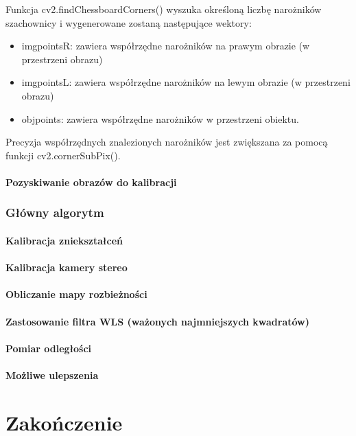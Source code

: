 \documentclass[magisterska]{pracadypl}
\begin{document}
Funkcja cv2.findChessboardCorners() wyszuka określoną liczbę narożników szachownicy
i wygenerowane zostaną następujące wektory:

\begin{itemize}
  \item imgpointsR: zawiera współrzędne narożników na prawym obrazie (w przestrzeni obrazu)
  \item imgpointsL: zawiera współrzędne narożników na lewym obrazie (w przestrzeni obrazu)
  \item objpoints: zawiera współrzędne narożników w przestrzeni obiektu.
\end{itemize}

Precyzja współrzędnych znalezionych narożników jest zwiększana za pomocą funkcji
cv2.cornerSubPix().

\subsubsection{Pozyskiwanie obrazów do kalibracji}
\subsection{Główny algorytm}
\subsubsection{Kalibracja zniekształceń}
\subsubsection{Kalibracja kamery stereo}
\subsubsection{Obliczanie mapy rozbieżności}
\subsubsection{Zastosowanie filtra WLS (ważonych najmniejszych kwadratów)}
\subsubsection{Pomiar odległości}
\subsubsection{Możliwe ulepszenia}

\chapter{Zakończenie}
\end{document}

